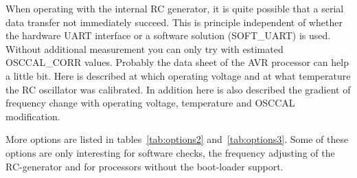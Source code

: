 When operating with the internal RC generator, it is quite possible that a serial data transfer
not immediately succeed. This is principle independent of whether the hardware UART interface
or a software solution (SOFT\_UART) is used.
Without additional measurement you can only try with estimated OSCCAL\_CORR values.
Probably the data sheet of the AVR processor can help a little bit.
Here is described at which operating voltage and at what temperature the RC oscillator
was calibrated. 
In addition here is also described the gradient of frequency change with operating voltage,
temperature and OSCCAL modification.

More options are listed in tables~\ref{tab:options2} and~\ref{tab:options3}. 
Some of these options are only interesting for software checks, the frequency adjusting of
the RC-generator and for processors without the boot-loader support.

